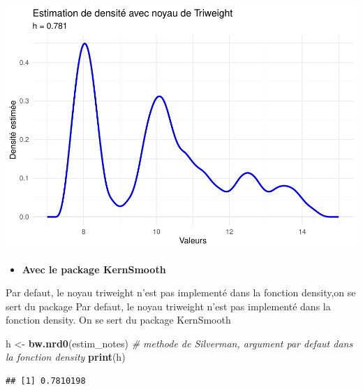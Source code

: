\documentclass[
  12pt,
]{article}
\newenvironment{Shaded}{\begin{snugshade}}{\end{snugshade}}
\newcommand{\CommentTok}[1]{\textcolor[rgb]{0.56,0.35,0.01}{\textit{#1}}}
\newcommand{\FunctionTok}[1]{\textcolor[rgb]{0.13,0.29,0.53}{\textbf{#1}}}
\newcommand{\NormalTok}[1]{#1}
\newcommand{\OtherTok}[1]{\textcolor[rgb]{0.56,0.35,0.01}{#1}}
\providecommand{\tightlist}{%
  \setlength{\itemsep}{0pt}\setlength{\parskip}{0pt}}
\begin{document}
\includegraphics{Stat_non_para_files/figure-latex/unnamed-chunk-161-1.pdf}

\begin{itemize}
\tightlist
\item
  \textbf{Avec le package KernSmooth}
\end{itemize}

Par defaut, le noyau triweight n'est pas implementé dans la fonction
density,on se sert du package Par defaut, le noyau triweight n'est pas
implementé dans la fonction density. On se sert du package KernSmooth

\begin{Shaded}
\begin{Highlighting}[]
\NormalTok{h }\OtherTok{\textless{}{-}} \FunctionTok{bw.nrd0}\NormalTok{(estim\_notes)  }\CommentTok{\# methode de Silverman, argument par defaut dans la fonction density}
\FunctionTok{print}\NormalTok{(h)}
\end{Highlighting}
\end{Shaded}

\begin{verbatim}
## [1] 0.7810198
\end{verbatim}
\end{document}
